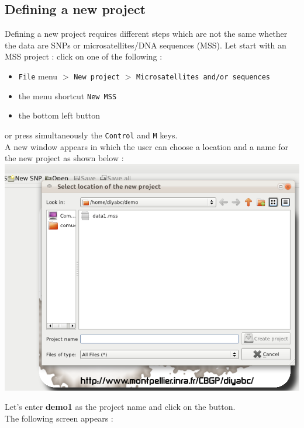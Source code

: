 




\subsection{Defining a new project}

Defining a new project requires different steps which are not the
same whether the data are SNPs or microsatellites/DNA sequences (MSS).
Let start with an MSS project : click on one of the following :
\begin{itemize}
\item \texttt{File} menu $>$ \texttt{New project} $>$ \texttt{Microsatellites
and/or sequences}
\item the menu shortcut \texttt{New MSS}
\item the bottom left button 
\end{itemize}
or press simultaneously the \texttt{Control} and \texttt{M} keys.\\
 A new window appears in which the user can choose a location and
a name for the new project as shown below :\\


\includegraphics[scale=0.35]{gui_pictures/Capture-DIYABC-7}

Let's enter \textbf{demo1} as the project name and click on the  button.\\
 The following screen appears :\\


